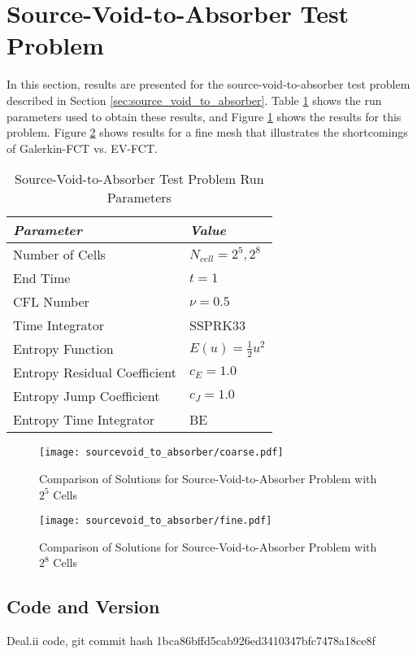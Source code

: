 \section{Source-Void-to-Absorber Test Problem}

In this section, results are presented for the
source-void-to-absorber test problem
described in Section \ref{sec:source_void_to_absorber}.
Table \ref{tab:source_void_to_absorber_run_parameters}
shows the run parameters used
to obtain these results, and Figure \ref{fig:source_void_to_absorber}
shows the results for this problem. Figure
\ref{fig:source_void_to_absorber_fine} shows results
for a fine mesh that illustrates the shortcomings of Galerkin-FCT
vs. EV-FCT.

\begin{table}[h]\caption{Source-Void-to-Absorber Test Problem Run Parameters}
\label{tab:source_void_to_absorber_run_parameters}
\centering
\begin{tabular}{l l}\toprule
\emph{Parameter} & \emph{Value}\\\midrule
Number of Cells & $N_{cell} = 2^5, 2^8$\\
End Time & $t = 1$\\
CFL Number & $\nu = 0.5$\\
Time Integrator & SSPRK33\\\midrule
Entropy Function & $E(u) = \frac{1}{2}u^2$\\
Entropy Residual Coefficient & $c_E = 1.0$\\
Entropy Jump Coefficient & $c_J = 1.0$\\
Entropy Time Integrator & BE\\
\bottomrule\end{tabular}
\end{table}
\begin{figure}[h]
   \texttt{[image: sourcevoid\_to\_absorber/coarse.pdf]}
   \caption{Comparison of Solutions for Source-Void-to-Absorber Problem
     with $2^5$ Cells}
   \label{fig:source_void_to_absorber}
\end{figure}
\begin{figure}[h]
   \texttt{[image: sourcevoid\_to\_absorber/fine.pdf]}
   \caption{Comparison of Solutions for Source-Void-to-Absorber Problem
     with $2^8$ Cells}
   \label{fig:source_void_to_absorber_fine}
\end{figure}
\subsection{Code and Version}
Deal.ii code, git commit hash 1bca86bffd5cab926ed3410347bfc7478a18ce8f

